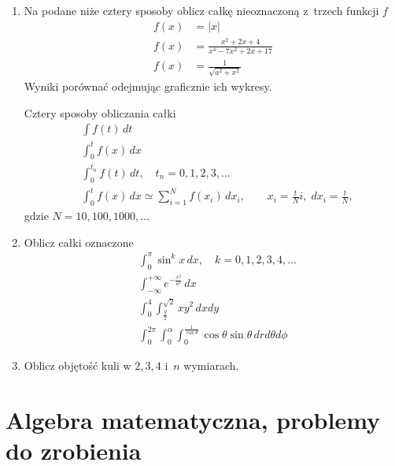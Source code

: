 \documentclass[a4paper,11pt]{article}
\begin{document}
\begin{enumerate}
\item Na podane niże cztery sposoby oblicz całkę nieoznaczoną z~trzech
  funkcji $f$
  \begin{align}
    f( x ) &= | x | \\
    f( x ) &= \frac{ x^{ 2 } + 2x + 4 }{ x^{ 4 } - 7 x^{ 2 } + 2x + 17 } \\
    f( x ) &= \frac{ 1 }{ \sqrt{ a^{ 2 } + x^{ 2 } } }
  \end{align}
  Wyniki porównać odejmując graficznie ich wykresy.

  Cztery sposoby obliczania całki
  \begin{align}
    &\int f( t ) \, dt \\
    &\int_{ 0 }^{ t } f( x ) \, dx \\
    &\int_{ 0 }^{ t_{ n } } f( t ) \, dt, \quad
      t_{ n } = 0, 1, 2, 3, \ldots \\
    &\int_{ 0 }^{ t } f( x ) \, dx \simeq \sum_{ i = 1 }^{ N } f( x_{ i } ) \, dx_{ i },
      \qquad
      x_{ i } = \frac{ t }{ N } i, \; dx_{ i } = \frac{ t }{ N },
  \end{align}
  gdzie $N = 10, 100, 1000, \ldots$

\item Oblicz całki oznaczone
  \begin{align}
    &\int_{ 0 }^{ \pi } \sin^{ k } x \, dx, \quad
      k = 0, 1, 2, 3, 4, \ldots \\
    &\int_{ -\infty }^{ +\infty } e^{ -\frac{ x^{ 2 } }{ a^{ 2 } } } \, dx \\
    &\int_{ 0 }^{ 4 } \int_{ \frac{ y }{ 2 } }^{ \sqrt{ 2 } } x y^{ 2 } \, dx dy \\
    &\int_{ 0 }^{ 2\pi } \int_{ 0 }^{ \alpha } \int_{ 0 }^{ \frac{ 1 }{ \cos \theta } } \cos\theta \sin\theta \,
      dr d\theta d\phi
  \end{align}

\item Oblicz objętość kuli w $2, 3, 4$ i~$n$ wymiarach.

\end{enumerate}










\section{Algebra matematyczna, problemy do zrobienia}
\end{document}
